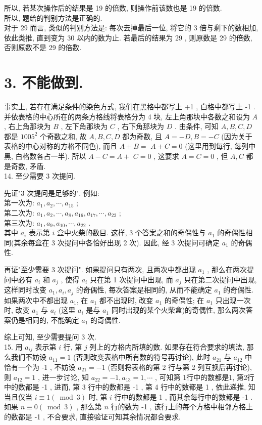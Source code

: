 所以, 若某次操作后的结果是 19 的倍数, 则操作前该数也是 19 的倍数. \\
所以, 题给的判别方法是正确的. \\
对于 29 而言, 类似的判别方法是: 每次去掉最后一位, 将它的 3 倍与剩下的数相加, 依此类推, 直到变为 30 以内的数为止. 若最后的结果为 29 , 则原数是 29 的倍数, 否则原数不是 29 的倍数.

\section{3. 不能做到.}
事实上, 若存在满足条件的染色方式, 我们在黑格中都写上 +1 , 白格中都写上 -1 . 并依表格的中心所在的两条方格线将表格分为 4 块, 左上角那块中各数之和设为 $A$ , 右上角那块为 $B$ , 左下角那块为 $C$ , 右下角那块为 $D$ . 由条件, 可知 $A ,  B ,  C ,  D$ 都是 $1005^{2}$ 个奇数之和, 故 $A ,  B ,  C ,  D$ 都为奇数, 且 $A=-D, B=-C$ (因为关于表格的中心对称的方格不同色), 而且 $A+B=$ $A+C=0$ (这里用到每行, 每列中黑, 白格数各占一半). 所以 $A-C=A+$ $C=0$ , 这要求 $A=C=0$ , 但 $A ,  C$ 都是奇数, 矛盾.\\
14. 至少需要 3 次提问.

先证"3 次提问是足够的". 例如: \\
第一次为: $a_{1}, a_{2}, \cdots, a_{15}$ ; \\
第二次为: $a_{1}, a_{2}, \cdots, a_{8}, a_{16}, a_{17}, \cdots, a_{22}$ ; \\
第三次为: $a_{1}, a_{9}, a_{10}, \cdots, a_{22}$ . \\
其中 $a_{i}$ 表示第 $i$ 盒中火柴的数目. 这样,  3 个答案之和的奇偶性与 $a_{1}$ 的奇偶性相同(其余每盒在 3 次提问中各恰好出现 2 次). 因此, 经 3 次提问可确定 $a_{1}$ 的奇偶性.

再证"至少需要 3 次提问". 如果提问只有两次, 且两次中都出现 $a_{1}$ , 那么在两次提问中必有 $a_{i}$ 和 $a_{j}$ , 使得 $a_{i}$ 只在第 1 次提问中出现, 而 $a_{j}$ 只在第二次提问中出现, 这样同时改变 $a_{1} ,  a_{i} ,  a_{j}$ 的奇偶性, 每次答案是相同的, 从而不能确定 $a_{1}$ 的奇偶性. 如果两次中不都出现 $a_{1}$, 在 $a_{1}$ 都不出现时, 改变 $a_{1}$ 的奇偶性; 在 $a_{1}$ 只出现一次时, 改变 $a_{1}$ 与 $a_{i}$ (这里 $a_{i}$ 是与 $a_{1}$ 同时出现的某个火柴盒)的奇偶性, 那么两次答案仍是相同的, 不能确定 $a_{1}$ 的奇偶性.

综上可知, 至少需要提问 3 次. \\
15. 用 $a_{i j}$ 表示第 $i$ 行, 第 $j$ 列上的方格内所填的数. 如果存在符合要求的填法, 那么我们不妨设 $a_{11}=1$ (否则改变表格中所有数的符号再讨论), 此时 $a_{21}$ 与 $a_{12}$ 中恰有一个为 -1 , 不妨设 $a_{21}=-1$ (否则将表格的第 2 行与第 2 列互换后再讨论), 则 $a_{12}=1$ , 进一步讨论, 知 $a_{22}=-1, a_{13}=1, \cdots$ , 可知第 1行中的数都是1, 第2行中的数都是 -1 , 进而, 第 3 行中的数都是 -1 , 第 4 行中的数都是 1 , 依此递推, 知当且仅当 $i \equiv 1(\bmod 3)$ 时, 第 $i$ 行中的数都是 1 , 而其余每行中的数都是 -1 . 如果 $n \equiv 0(\bmod 3)$ , 那么第 $n$ 行的数为 -1 , 该行上的每个方格中相邻方格上的数都是 -1 , 不合要求, 直接验证可知其余情况都合要求.

